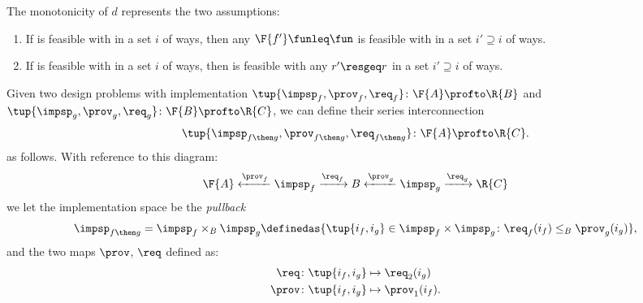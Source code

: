 {    The monotonicity of $d$ represents the two assumptions:
    \begin{enumerate}
        \item If \fun is feasible with \res in a set $i$ of ways, then any $\F{f'}\funleq \fun$ is feasible with \res in a set $i'\supseteq i$ of ways.
        \item If \fun is feasible with \res in a set $i$ of ways, then \fun is feasible with any $r'\resgeq r$ in a set $i'\supseteq i$ of ways.
    \end{enumerate}

    \begin{definition}
        \label{def:seriesdpi}
        Given two design problems with implementation $\tup{\impsp_f,\prov_f,\req_f}\colon \F{A}\profto \R{B}$
        and $\tup{\impsp_g,\prov_g,\req_g}\colon \F{B}\profto \R{C}$, we can define their
        series interconnection
        \begin{equation*}
            \tup{\impsp_{f\then g},\prov_{f\then g},\req_{f\then g}}\colon \F{A}\profto \R{C}.
        \end{equation*}
        as follows.
        With reference to this diagram:
        \begin{equation}
            \F{A} \xleftarrow{\prov_f} \impsp_f \xrightarrow{\req_f} B
            \xleftarrow{\prov_g} \impsp_g \xrightarrow{\req_g} \R{C}
        \end{equation}
        we let the implementation space be the \emph{pullback}
        \begin{equation}
            \begin{aligned}
                \impsp_{f\then g} & = \impsp_f \times_B \impsp_g \definedas \{ 
                \tup{i_f,i_g} \in \impsp_f \times \impsp_g \colon
                \req_f(i_f) \leq_{B} \prov_g(i_g)
                \},                                                            \\
            \end{aligned}
        \end{equation}
        and the two maps $\prov$, $\req$ defined as:
        \begin{equation}
            \begin{aligned}
                \req  & \colon \tup{i_f,i_g} \mapsto \req_2(i_g)    \\
                \prov & \colon  \tup{i_f,i_g} \mapsto \prov_1(i_f). 
            \end{aligned}

\end{equation}
\end{definition}}

